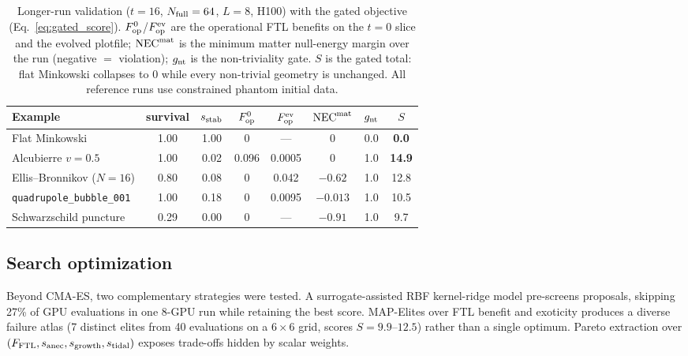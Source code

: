 \documentclass[twocolumn,floatfix,aps,prd,nofootinbib]{revtex4-2}
\begin{document}
\begin{table}[t]
\caption{Longer-run validation ($t=16$, $N_{\rm full}=64$, $L=8$, H100) with the gated objective (Eq.~\ref{eq:gated_score}).  $F_{\rm op}^{0}$/$F_{\rm op}^{\rm ev}$ are the operational FTL benefits on the $t=0$ slice and the evolved plotfile; $\mathrm{NEC}^{\rm mat}$ is the minimum matter null-energy margin over the run (negative $=$ violation); $g_{\rm nt}$ is the non-triviality gate.  $S$ is the gated total: flat Minkowski collapses to $0$ while every non-trivial geometry is unchanged.  All reference runs use constrained phantom initial data.}
\label{tab:longrun_validation}
\small
\begin{ruledtabular}
\begin{tabular}{lccccccc}
Example & survival & $s_{\rm stab}$ & $F_{\rm op}^{0}$ & $F_{\rm op}^{\rm ev}$ & $\mathrm{NEC}^{\rm mat}$ & $g_{\rm nt}$ & $S$ \\
\hline
Flat Minkowski            & 1.00 & 1.00 & 0      & ---    & $0$      & 0.0 & \textbf{0.0} \\
Alcubierre $v=0.5$        & 1.00 & 0.02 & 0.096  & 0.0005 & $0$      & 1.0 & \textbf{14.9} \\
Ellis--Bronnikov ($N{=}16$) & 0.80 & 0.08 & 0    & 0.042  & $-0.62$  & 1.0 & 12.8 \\
\texttt{quadrupole\_bubble\_001} & 1.00 & 0.18 & 0 & 0.0095 & $-0.013$ & 1.0 & 10.5 \\
Schwarzschild puncture    & 0.29 & 0.00 & 0      & ---    & $-0.91$  & 1.0 & 9.7  \\
\end{tabular}
\end{ruledtabular}
\end{table}

\subsection{Search optimization}

Beyond CMA-ES, two complementary strategies were tested.  A surrogate-assisted RBF kernel-ridge model pre-screens proposals, skipping 27\% of GPU evaluations in one 8-GPU run while retaining the best score.  MAP-Elites over FTL benefit and exoticity produces a diverse failure atlas (7 distinct elites from 40 evaluations on a $6{\times}6$ grid, scores $S=9.9$--$12.5$) rather than a single optimum.  Pareto extraction over $(F_{\rm FTL},s_{\rm anec},s_{\rm growth},s_{\rm tidal})$ exposes trade-offs hidden by scalar weights.
\end{document}
